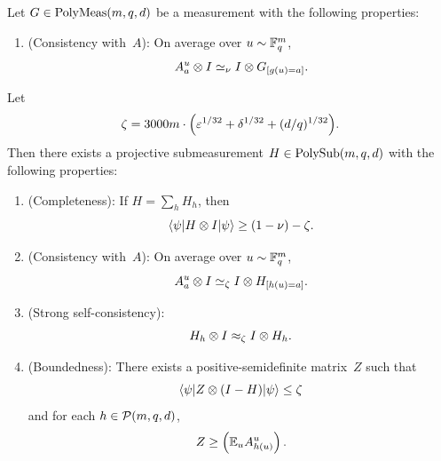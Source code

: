 \begin{theorem}\label{thm:self-improvement}
  \leanok
  Let $G \in \mathrm{PolyMeas}(m,q,d)$ be a measurement with the following properties:
  \begin{enumerate}
    \item (Consistency with~$A$): \label{item:self-improvement-projective-G-consistency} On average over $u \sim \mathbb{F}_q^{m}$,
    \[
      A^{u}_a \otimes I \simeq_{\nu} I \otimes G_{[g(u)=a]}.
    \]
  \end{enumerate}
  Let
  \[
    \zeta = 3000m\cdot \Big(\varepsilon^{1/32} + \delta^{1/32} + (d/q)^{1/32}\Big).
  \]
  Then there exists a projective submeasurement $H \in \mathrm{PolySub}(m,q,d)$ with the following properties:
  \begin{enumerate}
    \item (Completeness): \label{item:self-improvement-projective-completeness} If $H = \sum_h H_h$, then
    \[
      \langle \psi \rvert H \otimes I \lvert \psi \rangle \geq (1-\nu)-\zeta.
    \]
    \item (Consistency with~$A$): \label{item:self-improvement-projective-A-consistency} On average over $u \sim \mathbb{F}_q^m$,
    \[
      A^u_a \otimes I \simeq_{\zeta} I \otimes H_{[h(u) = a]}.
    \]
    \item (Strong self-consistency): \label{item:self-improvement-projective-self}
    \[
      H_h \otimes I \approx_{\zeta} I \otimes H_h.
    \]
    \item (Boundedness): \label{item:self-improvement-projective-boundedness} There exists a positive-semidefinite matrix~$Z$ such that
    \[
      \langle \psi \rvert Z \otimes (I - H) \lvert \psi \rangle \leq \zeta
    \]
    and for each $h \in \mathcal{P}(m,q,d)$,
    \[
      Z \geq \left(\mathbb{E}_{u} A^{u}_{h(u)}\right).
    \]
  \end{enumerate}
\end{theorem}
